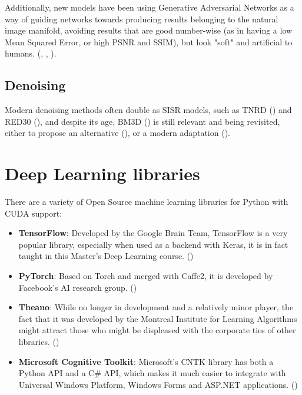 \hfill

Additionally, new models have been using Generative Adversarial Networks as a way of guiding networks towards producing results belonging to the natural image manifold, avoiding results that are good number-wise (as in having a low Mean Squared Error, or high PSNR and SSIM), but look "soft" and artificial to humans. (\cite{SRGAN}, \cite{SFT-GAN}, \cite{CinCGAN}).

\subsection{Denoising}

Modern denoising methods often double as SISR models, such as TNRD (\cite{TNRD}) and RED30 (\cite{RED30}), and despite its age, BM3D (\cite{BM3D}) is still relevant and being revisited, either to propose an alternative (\cite{MLP-BM3D}), or a modern adaptation (\cite{BM3D-Net}). 

\section{Deep Learning libraries}

There are a variety of Open Source machine learning libraries for Python with CUDA support:

\begin{itemize}
    \item \textbf{TensorFlow}: Developed by the Google Brain Team, TensorFlow is a very popular library, especially when used as a backend with Keras, it is in fact taught in this Master's Deep Learning course. (\cite{tensorflow})
    \item \textbf{PyTorch}: Based on Torch and merged with Caffe2, it is developed by Facebook's AI research group. (\cite{pytorch})
    \item \textbf{Theano}: While no longer in development and a relatively minor player, the fact that it was developed by the Montreal Institute for Learning Algorithms might attract those who might be displeased with the corporate ties of other libraries. (\cite{theano})
    \item \textbf{Microsoft Cognitive Toolkit}: Microsoft's CNTK library has both a Python API and a C\# API, which makes it much easier to integrate with Universal Windows Platform, Windows Forms and ASP.NET applications. (\cite{cntk})
\end{itemize}